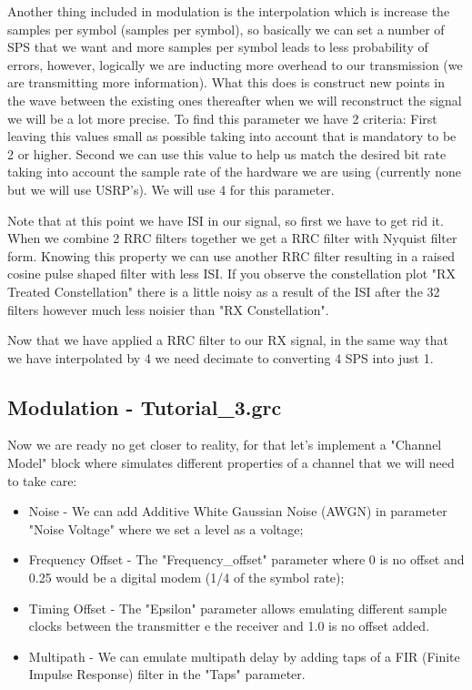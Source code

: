 \documentclass[a4paper, 10pt, conference]{ieeeconf}      %
\begin{document}
    Another thing included in modulation is the interpolation which is increase the samples per symbol (samples per symbol), so basically we can set a number of SPS that we want and more samples per symbol leads to less probability of errors, however, logically we are inducting more overhead to our transmission (we are transmitting more information). What this does is construct new points in the wave between the existing ones thereafter when we will reconstruct the signal we will be a lot more precise. To find this parameter we have 2 criteria:  First leaving this values small as possible taking into account that is mandatory to be 2 or higher. Second we can use this value to help us match the desired bit rate taking into account the sample rate of the hardware we are using (currently none but we will use USRP's). We will use 4 for this parameter.
    
    Note that at this point we have ISI in our signal, so first we have to get rid it. When we combine 2 RRC filters together we get a RRC filter with Nyquist filter form. Knowing this property we can use another RRC filter resulting in a raised cosine pulse shaped filter with less ISI. If you observe the constellation plot "RX Treated Constellation" there is a little noisy as a result of the ISI after the 32 filters however much less noisier than "RX Constellation". 
    
    Now that we have applied a RRC filter to our RX signal, in the same way that we have interpolated by 4 we need decimate to converting 4 SPS into just 1.

\subsection{Modulation - Tutorial\_3.grc}
    Now we are ready no get closer to reality, for that let's implement a "Channel Model" block where simulates different properties of a channel that we will need to take care:
    
\begin{itemize}
\item Noise - We can add Additive White Gaussian Noise (AWGN) in parameter "Noise Voltage" where we set a level as a voltage;
\item Frequency Offset - The "Frequency\_offset" parameter where 0 is no offset and 0.25 would be a digital modem (1/4 of the symbol rate);
\item Timing Offset - The "Epsilon" parameter allows emulating different sample clocks between the transmitter e the receiver and 1.0 is no offset added.
\item Multipath - We can emulate multipath delay by adding taps of a FIR (Finite Impulse Response) filter in the "Taps" parameter.
\end{itemize}
    
\end{document}
